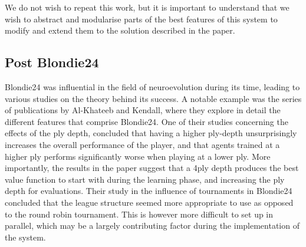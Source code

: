 \documentclass[12pt,a4paper]{article}
\begin{document}
        We do not wish to repeat this work, but it is important to understand that we wish to abstract and modularise parts of the best features of this system to modify and extend them to the solution described in the paper.

    \subsection{Post Blondie24}

        Blondie24 was influential in the field of neuroevolution during its time, leading to various studies on the theory behind its success. A notable example was the series of publications by Al-Khateeb and Kendall, where they explore in detail the different features that comprise Blondie24. One of their studies concerning the effects of the ply depth, concluded that having a higher ply-depth unsurprisingly increases the overall performance of the player, and that agents trained at a higher ply performs significantly worse when playing at a lower ply. More importantly, the results in the paper suggest that a 4ply depth produces the best value function to start with during the learning phase, and increasing the ply depth for evaluations. \cite{al-khateeb_effect_2012} Their study in the influence of tournaments in Blondie24 concluded that the league structure seemed more appropriate to use as opposed to the round robin tournament. \cite{al-khateeb_introducing_2009} This is however more difficult to set up in parallel, which may be a largely contributing factor during the implementation of the system.
        

        
\end{document}
